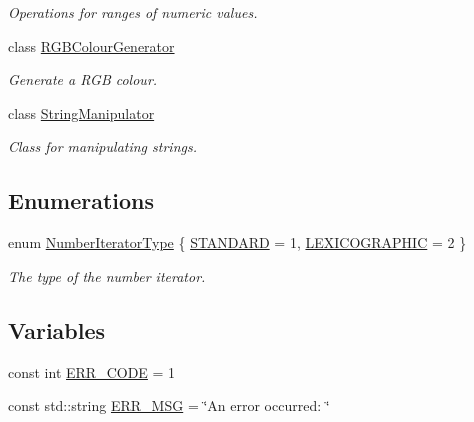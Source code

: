 \begin{DoxyCompactItemize}
\begin{DoxyCompactList}\small\item\em \-Operations for ranges of numeric values. \end{DoxyCompactList}\item 
class \hyperlink{classmultiscale_1_1RGBColourGenerator}{\-R\-G\-B\-Colour\-Generator}
\begin{DoxyCompactList}\small\item\em \-Generate a \-R\-G\-B colour. \end{DoxyCompactList}\item 
class \hyperlink{classmultiscale_1_1StringManipulator}{\-String\-Manipulator}
\begin{DoxyCompactList}\small\item\em \-Class for manipulating strings. \end{DoxyCompactList}\end{DoxyCompactItemize}
\subsection*{\-Enumerations}
\begin{DoxyCompactItemize}
\item 
enum \hyperlink{namespacemultiscale_a6ef911f4d48a4bf5e657c237ec169ff5}{\-Number\-Iterator\-Type} \{ \hyperlink{namespacemultiscale_a6ef911f4d48a4bf5e657c237ec169ff5aa048887eb0360a4b70dff5452133f42e}{\-S\-T\-A\-N\-D\-A\-R\-D} =  1, 
\hyperlink{namespacemultiscale_a6ef911f4d48a4bf5e657c237ec169ff5a2cba3a0174cc5c1d555ee13dcf6cda15}{\-L\-E\-X\-I\-C\-O\-G\-R\-A\-P\-H\-I\-C} =  2
 \}
\begin{DoxyCompactList}\small\item\em \-The type of the number iterator. \end{DoxyCompactList}\end{DoxyCompactItemize}
\subsection*{\-Variables}
\begin{DoxyCompactItemize}
\item 
const int \hyperlink{namespacemultiscale_a4ee40795105048ee371efeeb7962ecf6}{\-E\-R\-R\-\_\-\-C\-O\-D\-E} = 1
\item 
const std\-::string \hyperlink{namespacemultiscale_a06490e4e11ef359aa0260f96579ce584}{\-E\-R\-R\-\_\-\-M\-S\-G} = \char`\"{}\-An error occurred\-: \char`\"{}
\end{DoxyCompactItemize}


